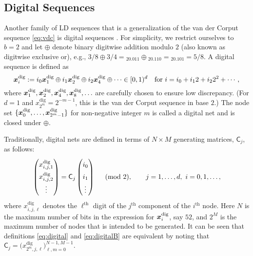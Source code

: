 \documentclass{svproc}
\begin{document}

\subsection{Digital Sequences} \label{sec:digital}

Another family of LD sequences that is a generalization of the van der Corput sequence \eqref{eq:vdc} is digital sequences \cite{DicPil10a,Nie92}.  For simplicity, we restrict ourselves to $b = 2$ and let $\oplus$ denote binary digitwise addition modulo $2$ (also known as digitwise exclusive or), e.g., $3/8 \oplus 3/4 = {}_20.011 \oplus {}_20.110 = {}_20.101 = 5/8$.  A digital sequence is defined as
\begin{equation} \label{eq:digital}
	{\boldsymbol{x}}_i^{\text{dig}} := i_0 {\boldsymbol{x}}^{\text{dig}} _1 \oplus i_1 {\boldsymbol{x}}^{\text{dig}}_2 \oplus i_2 {\boldsymbol{x}}^{\text{dig}} _4 \oplus \cdots \in [0,1)^d \quad \text{for }
	i = i_0 + i_12 + i_2 2^2 + \cdots,
\end{equation}
where ${\boldsymbol{x}}^{\text{dig}}_1, {\boldsymbol{x}}^{\text{dig}}_2, {\boldsymbol{x}}^{\text{dig}}_4, {\boldsymbol{x}}^{\text{dig}}_8, \ldots$ are carefully chosen to ensure low discrepancy.  (For $d=1$ and $x^{\text{dig}}_{2^m} = 2^{-m-1}$, this is the van  der Corput sequence in base $2$.) The node set $\{ {\boldsymbol{x}}^{\text{dig}}_0, \ldots, {\boldsymbol{x}}^{\text{dig}}_{2^m-1}\}$  for non-negative integer $m$ is called a digital net and is closed under $\oplus$.

Traditionally, digital nets are defined in terms of $N \times M$ generating matrices, $\mathsf{C}_j$, as follows:
\begin{equation} \label{eq:digitalB}
\renewcommand{\arraystretch}{1.5}
	\begin{pmatrix} x^{\text{dig}}_{i,j,1} \\ x^{\text{dig}}_{i,j,2} \\ \vdots \end{pmatrix}
	= \mathsf{C}_j \begin{pmatrix} i_0 \\ i_1 \\ \vdots \end{pmatrix}
    \quad \pmod{2}, \qquad j = 1,\ldots, d, \ i = 0, 1, \ldots,
\end{equation}
where $x^{\text{dig}}_{i,j,\ell}$ denotes the $\ell^{\text{th}}$ digit of the $j^{\text{th}}$ component of the $i^{\text{th}}$ node.  Here $N$ is the maximum number of bits in the expression for ${\boldsymbol{x}}^{\text{dig}}_i$, say $52$, and $2^M$ is the maximum number of nodes that is intended to be generated.
It can be seen that definitions  \eqref{eq:digital} and \eqref{eq:digitalB} are equivalent by noting that $\mathsf{C}_j = \bigl(x^{\text{dig}}_{2^m,j,\ell}\bigr)_{\ell,m = 0}^{N-1,M-1}$.
\end{document}
